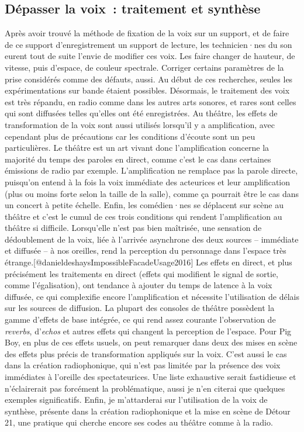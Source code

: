 \documentclass[
]{article}
\begin{document}
\subsection{Dépasser la voix~: traitement et synthèse}\label{duxe9passer-la-voix-traitement-et-synthuxe8se}

Après avoir trouvé la méthode de fixation de la voix sur un support, et de faire de ce support d'enregistrement un support de lecture, les technicien·nes du son eurent tout de suite l'envie de modifier ces voix. Les faire changer de hauteur, de vitesse, puis d'espace, de couleur spectrale. Corriger certains paramètres de la prise considérés comme des défauts, aussi. Au début de ces recherches, seules les expérimentations sur bande étaient possibles. Désormais, le traitement des voix est très répandu, en radio comme dans les autres arts sonores, et rares sont celles qui sont diffusées telles qu'elles ont été enregistrées. Au théâtre, les effets de transformation de la voix sont aussi utilisés lorsqu'il y a amplification, avec cependant plus de précautions car les conditions d'écoute sont un peu particulières. Le théâtre est un art vivant donc l'amplification concerne la majorité du temps des paroles en direct, comme c'est le cas dans certaines émissions de radio par exemple. L'amplification ne remplace pas la parole directe, puisqu'on entend à la fois la voix immédiate des acteurices et leur amplification (plus ou moins forte selon la taille de la salle), comme ça pourrait être le cas dans un concert à petite échelle. Enfin, les comédien·nes se déplacent sur scène au théâtre et c'est le cumul de ces trois conditions qui rendent l'amplification au théâtre si difficile. Lorsqu'elle n'est pas bien maîtrisée, une sensation de dédoublement de la voix, liée à l'arrivée asynchrone des deux sources -- immédiate et diffusée -- à nos oreilles, rend la perception du personnage dans l'espace très étrange.{[}@danieldeshaysImpossibleFacadeUsage2016{]} Les effets en direct, et plus précisément les traitements en direct (effets qui modifient le signal de sortie, comme l'égalisation), ont tendance à ajouter du temps de latence à la voix diffusée, ce qui complexifie encore l'amplification et nécessite l'utilisation de délais sur les sources de diffusion. La plupart des consoles de théâtre possèdent la gamme d'effets de base intégrée, ce qui rend assez courante l'observation de \emph{reverbs}, d'\emph{echos }et autres effets qui changent la perception de l'espace. Pour Pig Boy, en plus de ces effets usuels, on peut remarquer dans deux des mises en scène des effets plus précis de transformation appliqués sur la voix. C'est aussi le cas dans la création radiophonique, qui n'est pas limitée par la présence des voix immédiates à l'oreille des spectateurices. Une liste exhaustive serait fastidieuse et n'éclairerait pas forcément la problématique, aussi je n'en citerai que quelques exemples significatifs. Enfin, je m'attarderai sur l'utilisation de la voix de synthèse, présente dans la création radiophonique et la mise en scène de Détour 21, une pratique qui cherche encore ses codes au théâtre comme à la radio.
\end{document}
